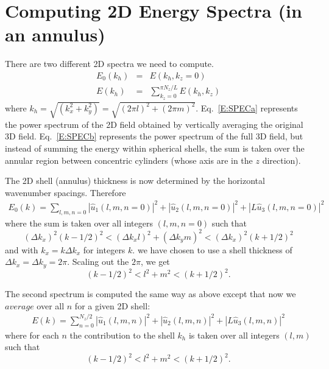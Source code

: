 \documentclass[12pt]{article}
\begin{document}
\section{Computing 2D Energy Spectra (in an annulus)}
There are two different 2D spectra we need to compute. 
\begin{eqnarray}
E_0(k_h) &=& E(k_h, k_z=0) 
\label{E:SPECa} \\
E(k_h) &=& \sum_{k_z=0}^{\pi N_z/L} E(k_h,k_z) 
\label{E:SPECb}
\end{eqnarray}
where $k_h = \sqrt{(k_x^2 + k_y^2)} = \sqrt{(2\pi l)^2 + (2\pi m)^2}$. 
Eq.~\ref{E:SPECa} represents the power spectrum of the 2D field
obtained by vertically averaging the original 3D field.
Eq.~\ref{E:SPECb} represents
the power spectrum of the full 3D field, but instead of 
summing the energy within spherical shells, the sum is
taken over the annular region between concentric cylinders
(whose axis are in the $z$ direction).


The 2D shell (annulus) thickness is now
determined by the horizontal wavenumber spacings. Therefore 
\begin{eqnarray*}
E_0(k) = \sum_{l,m,n=0}  |  {\hat u_1}(l,m,n=0) |^2 +
 |  {\hat u_2}(l,m,n=0) |^2 + 
 |  L {\hat u_3}(l,m,n=0) |^2
\end{eqnarray*}
where the sum is taken over all integers $(l,m,n=0)$ such that
\[
(\Delta k_x)^2 (k-1/2)^2 < (\Delta k_x l)^2 + (\Delta k_y m)^2  <  (\Delta k_x)^2 (k+1/2)^2 
\]
and with $k_x=k \Delta k_x$ for integers $k$.  
we have chosen to use a shell thickness of $\Delta k_x = \Delta
k_y = 2\pi$. Scaling out the $2\pi$, we get
\[
(k-1/2)^2 < l^2 + m^2 < (k+1/2)^2.
\]  

The second spectrum is computed the same way as above except that now
we $average$ over all $n$ for a given 2D shell:
\begin{eqnarray}
E(k) = \sum_{n=0}^{N_z/2}  |  {\hat u_1}(l,m,n) |^2 +
 |  {\hat u_2}(l,m,n) |^2 + 
 |  L {\hat u_3}(l,m,n) |^2
\end{eqnarray}
where for each $n$ the contribution to the shell $k_h$ is 
taken over all integers $(l,m)$ such that
\[
(k-1/2)^2 < l^2 + m^2 < (k+1/2)^2.
\]  
\end{document}
